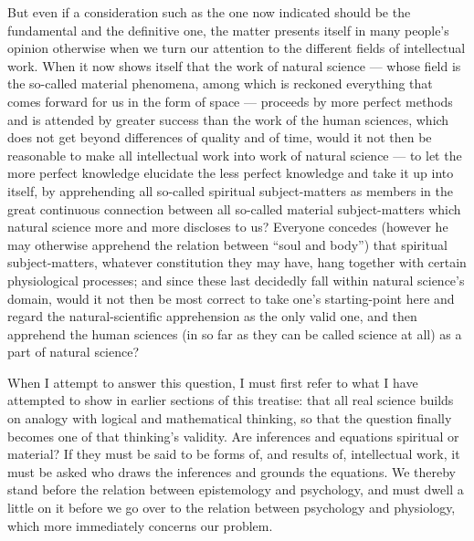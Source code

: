 \documentclass[12pt]{book}
\newcommand{\opage}[1]{\marginnote{\footnotesize\textit{[#1]}}}
\begin{document}
But even if a con\-sid\-er\-a\-tion such as the one now indicated should be the
fun\-da\-men\-tal and the de\-fin\-i\-tive one, the matter presents itself in many people's
opinion otherwise when we turn our attention to the different fields of
intellectual work. When it now shows itself that the work of natural science ---
whose field is the so-called material phenomena, among which is reckoned
everything that comes forward for us in the form of space --- proceeds by more
perfect methods and is attended by greater success than the work of the human
sciences, which does not get beyond differences of quality and of time, would it
not then be reasonable to make all intellectual work into work of natural science
--- to let the more perfect knowledge elucidate the less perfect knowledge and
take it up into itself, by apprehending all so-called spiritual subject-matters
as members in the great continuous \opage{111}connection between all so-called material
subject-matters which natural science more and more discloses to us? Everyone
concedes (however he may otherwise apprehend the relation between ``soul and
body'') that spiritual subject-matters, whatever constitution they may have, hang
together with certain physiological processes; and since these last decidedly
fall within natural science's domain, would it not then be most correct to take
one's starting-point here and regard the natural-scientific apprehension as the
only valid one, and then apprehend the human sciences (in so far as they can be
called science at all) as a part of natural science?

When I attempt to answer this question, I must first refer to what I have
attempted to show in earlier sections of this treatise: that all real science
builds on analogy with logical and mathematical thinking, so that the question
finally becomes one of that thinking's validity. Are inferences and equations
spiritual or material? If they must be said to be forms of, and results of,
intellectual work, it must be asked who draws the inferences and grounds the
equations. We thereby stand before the relation between epistemology and
psychology, and must dwell a little on it before we go over to the relation
between psychology and physiology, which more immediately concerns our problem.
\end{document}
